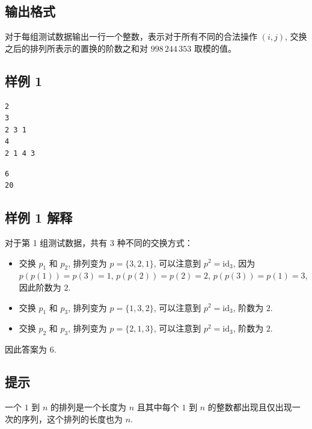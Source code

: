 \subsection{输出格式}

对于每组测试数据输出一行一个整数，表示对于所有不同的合法操作 $(i, j)$, 交换之后的排列所表示的置换的阶数之和对 $998\,244\,353$ 取模的值。

\subsection{样例 1}

\begin{minipage}{\linewidth}
	\begin{minipage}[t]{0.49\linewidth}
		\begin{lstlisting}[title=\texttt{standard input}]
2
3
2 3 1
4
2 1 4 3
\end{lstlisting}
	\end{minipage}
	\begin{minipage}[t]{0.49\linewidth}
		\begin{lstlisting}[title=\texttt{standard output}]
6
20
\end{lstlisting}
	\end{minipage}
\end{minipage}


\subsection{样例 1 解释}

对于第 1 组测试数据，共有 $3$ 种不同的交换方式：
\begin{itemize}
   \item 交换 $p_1$ 和 $p_2$, 排列变为 $p = \{3, 2, 1\}$, 可以注意到 $p^2 = \text{id}_3$, 因为 $p(p(1)) = p(3) = 1$, $p(p(2)) = p(2) = 2$, $p(p(3)) = p(1) = 3$, 因此阶数为 $2$.
   \item 交换 $p_1$ 和 $p_3$, 排列变为 $p = \{1, 3, 2\}$, 可以注意到 $p^2 = \text{id}_3$, 阶数为 $2$.
   \item 交换 $p_2$ 和 $p_3$, 排列变为 $p = \{2, 1, 3\}$, 可以注意到 $p^2 = \text{id}_3$, 阶数为 $2$.
\end{itemize}

因此答案为 $6$.

\subsection{提示}

一个 $1$ 到 $n$ 的排列是一个长度为 $n$ 且其中每个 $1$ 到 $n$ 的整数都出现且仅出现一次的序列，这个排列的长度也为 $n$.

